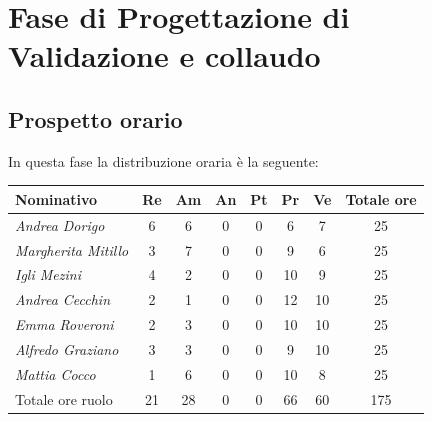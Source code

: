 {{{{{{{{\section{Fase di Progettazione di Validazione e collaudo}\label{PreventivoFaseDiProgettazionediValidazioneECollaudo}

\subsection{Prospetto orario}\label{PreventivoPreventivoFaseDiProgettazionediValidazioneECollaudoProspettoOrario}
In questa fase la distribuzione oraria è la seguente:
\quad
\def\tabularxcolumn#1{m{#1}}
{
	
	\begin{center}
		\renewcommand{\arraystretch}{1.4}
		\begin{tabularx}{\textwidth}{|X|c|c|c|c|c|c|c|}
			\hline
			\rowcolor{airforceblue}
			\textbf{Nominativo} & \textbf{Re} & \textbf{Am} & \textbf{An} & \textbf{Pt} & \textbf{Pr} & \textbf{Ve} & \textbf{Totale ore}\\
			\hline
			\textit{Andrea Dorigo} & 6 & 6 & 0 & 0 & 6 & 7 & 25\\
			\hline
			\textit{Margherita Mitillo} & 3 & 7 & 0 & 0 & 9 & 6 & 25\\
			\hline
			\textit{Igli Mezini} & 4 & 2 & 0 & 0 & 10 & 9 & 25\\
			\hline
			\textit{Andrea Cecchin} & 2 & 1 & 0 & 0 & 12 & 10 & 25\\
			\hline
			\textit{Emma Roveroni} & 2 & 3 & 0 & 0 & 10 & 10 & 25\\
			\hline
			\textit{Alfredo Graziano} & 3 & 3 & 0 & 0 & 9 & 10 & 25\\
			\hline
			\textit{Mattia Cocco} & 1 & 6 & 0 & 0 & 10 & 8 & 25\\
			\hline
			Totale ore ruolo & 21 & 28 & 0 & 0 & 66 & 60 & 175\\
			\hline
		\end{tabularx}
	\end{center}

}}}}}}}}}
